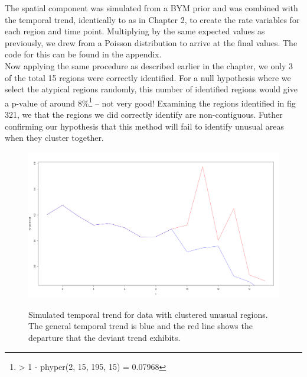 \documentclass[11pt]{report}
\begin{document}
The spatial component was simulated from a BYM prior and was combined with the temporal trend, identically to as in Chapter 2, to create the rate variables for each region and time point. Multiplying by the same expected values as previously, we drew from a Poisson distribution to arrive at the final values. The code for this can be found in the appendix. \\

Now applying the same procedure as described earlier in the chapter, we only 3 of the total 15 regions were correctly identified. For a null hypothesis where we select the atypical regions randomly, this number of identified regions would give a p-value of around 8\%\footnote{> 1 - phyper(2, 15, 195, 15) = 0.07968} -- not very good! Examining the regions identified in fig 321, we that the regions we did correctly identify are non-contiguous. Futher confirming our hypothesis that this method will fail to identify unusual areas when they cluster together.


\begin{figure}
\centering
\includegraphics[width=5in]{preftemporal}
\label{fig:preftemporal}
\caption{Simulated temporal trend for data with clustered unusual regions. The general temporal trend is blue and the red line shows the departure that the deviant trend exhibits.}
\end{figure}
\end{document}
